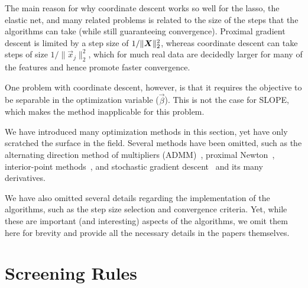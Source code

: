 The main reason for why coordinate descent works so well for the lasso, the elastic net, and many related problems is related to the size of the steps that the algorithms can take (while still guaranteeing convergence). Proximal gradient descent is limited by a step size of \(1/\lVert \boldsymbol{X}\rVert_2^2\), whereas coordinate descent can take steps of size \(1/\lVert \vec{x}_j \rVert_2^2\), which for much real data are decidedly larger for many of the features and hence promote faster convergence.


One problem with coordinate descent, however, is that it requires the objective to be separable in the optimization variable (\(\vec{\beta}\)). This is not the case for SLOPE, which makes the method inapplicable for this problem.

We have introduced many optimization methods in this section, yet have only scratched the surface in the field. Several methods have been omitted, such as the alternating direction method of multipliers (ADMM)~\parencite{boyd2010}, proximal Newton~\parencite{lee2014}, interior-point methods~\parencite{kim2007}, and stochastic gradient descent~\parencite{robbins1951,bottou2010} and its many derivatives.

We have also omitted several details regarding the implementation of the algorithms, such as the step size selection and convergence criteria. Yet, while these are important (and interesting) aspects of the algorithms, we omit them here for brevity and provide all the necessary details in the papers themselves.

\section{Screening Rules}\label{sec:screening-rules}

